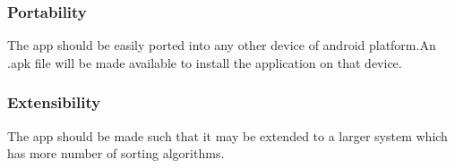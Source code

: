 \documentclass[a4paper,11pt]{article}
\begin{document}
\subsubsection{Portability}
		The app should be easily ported into any other device of android platform.An .apk file will be made available to install the application on that device.
\subsubsection{Extensibility}
		The app should be made such that it may be extended to a larger system which has more number of sorting algorithms.
\end{document}
